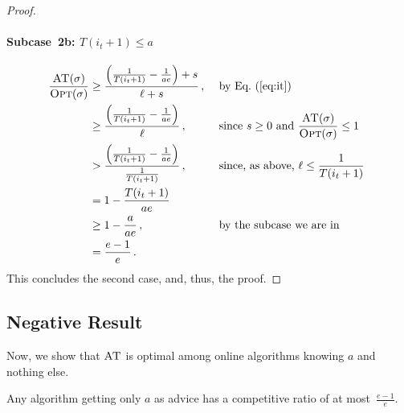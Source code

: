 \documentclass[a4paper,UKenglish,cleveref, autoref, thm-restate]{lipics-v2021}
\newcommand{\OPT}{\ensuremath{\operatorname{\textsc{Opt}}}\xspace}
\newcommand{\ADB}{\ensuremath{\operatorname{\textsc{AT}}}\xspace}
\newcommand{\TF}{T}
\begin{document}
\begin{proof}
\paragraph*{Subcase~2b: $\TF(i_t+1) \leq a$}
\begin{alignat*}{2}
  \frac{\ADB(\sigma)}{\OPT(\sigma)}
  & \geq
  \frac{\left(\frac{1}{\TF(i_t+1)}-\frac{1}{ae}\right) + s}{\ell+s}\,,
  &&\text{ by Eq.~(\ref{eq:it}) }\\
  & \geq
  \frac{\left(\frac{1}{\TF(i_t+1)}-\frac{1}{ae}\right)}{\ell}\,, && \text{
    since } s \geq 0 \text{ and } \frac{\ADB(\sigma)}{\OPT(\sigma)}
  \leq 1 \\
  & >
  \frac{\left(\frac{1}{\TF(i_t+1)}-\frac{1}{ae}\right)}{\frac{1}{\TF(i_t+1)}}\,,
  &&\text{ since, as above, $\ell \leq \frac{1}{\TF(i_t+1)}$ } \\
  & =
  1 - \frac{\TF(i_t+1)}{ae} \\
  & \geq
  1 - \frac{a}{ae}\,,&& \text{ by the subcase we are in} \\
  &  =
  \frac{e-1}{e}\,.
\end{alignat*}
This concludes the second case, and, thus, the proof.
\end{proof}

\subsection{Negative Result}
Now, we show that \ADB is optimal among
online algorithms knowing $a$ and nothing else.
\begin{theorem}
\label{thm:advneg}
  Any algorithm getting only $a$ as advice has a competitive ratio of
  at most~$\frac{e-1}{e}$.
\end{theorem}
\end{document}
